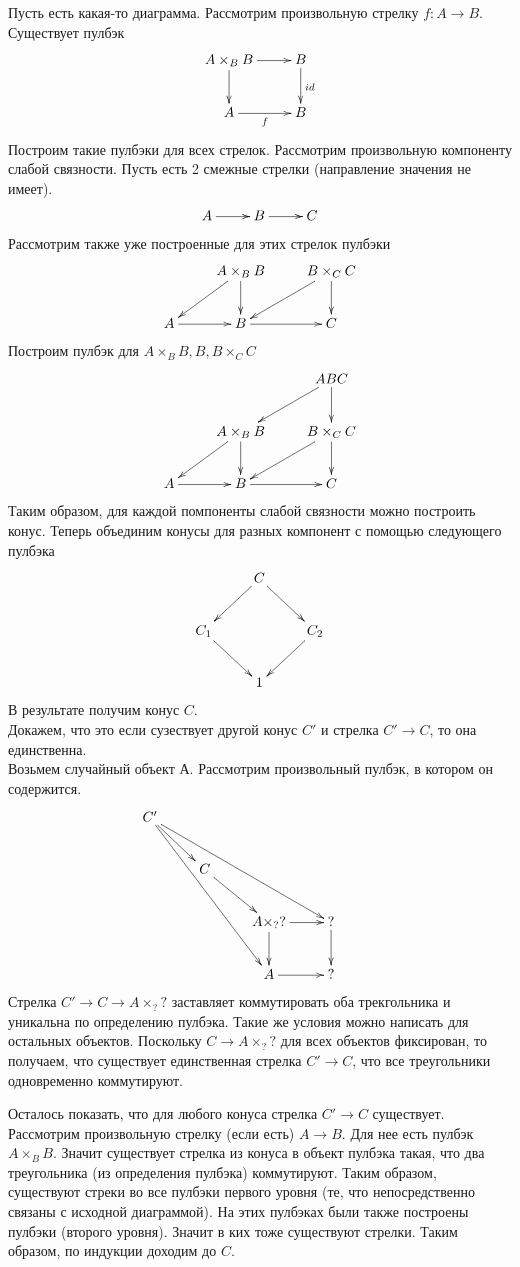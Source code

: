 \documentclass[draft]{article}
\begin{document}
\begin{enumerate}
Пусть есть какая-то диаграмма. Рассмотрим произвольную стрелку $f : A \to B$. Существует пулбэк
\[ \xymatrix{ 
A\times_B B \ar[d] \ar[r] & B \ar[d]^{id} \\
A \ar[r]_{f} & B
} \]
Построим такие пулбэки для всех стрелок. Рассмотрим произвольную компоненту слабой связности. Пусть есть 2 смежные стрелки (направление значения не имеет).
\[ \xymatrix{ 
A\ar[r] & B \ar[r] & C
} \]
Рассмотрим также уже построенные для этих стрелок пулбэки
\[ \xymatrix{ 
& A \times_B B \ar[dl] \ar[d] & B \times_C C \ar[dl] \ar[d] \\
A\ar[r] & B \ar[r] & C
} \]
Построим пулбэк для $A \times_B B, B, B \times_C C$
\[ \xymatrix{ 
&& ABC\ar[dl] \ar[d]\\
& A \times_B B \ar[dl] \ar[d] & B \times_C C \ar[dl] \ar[d] \\
A\ar[r] & B \ar[r] & C
} \]
Таким образом, для каждой помпоненты слабой связности можно построить конус.
Теперь объединим конусы для разных компонент с помощью следующего пулбэка
\[ \xymatrix{ 
&C\ar[dl] \ar[dr] &\\
C_1 \ar[dr] && C_2 \ar[dl] \\
& 1 & 
} \]
В результате получим конус $C$. \\
Докажем, что это если сузествует другой конус $C'$ и стрелка $C'\to C$, то она единственна. \\
Возьмем случайный объект А. Рассмотрим произвольный пулбэк, в котором он содержится. 
\[ \xymatrix{ 
C' \ar[dr] \ar[dddrr] \ar[ddrrr]& & &\\
& C \ar[dr] & & &\\
& & A\times_? ? \ar[d] \ar[r] & ? \ar[d] \\
& & A \ar[r] & ?
} \]
Стрелка $C'\to C \to A\times_? ?$ заставляет коммутировать оба трекгольника и уникальна по определению пулбэка. Такие же условия можно написать для остальных объектов. Поскольку $C \to A\times_? ?$ для всех объектов фиксирован, то получаем, что существует единственная стрелка $C'\to C$, что все треугольники одновременно коммутируют.

Осталось показать, что для любого конуса стрелка $C' \to C$ существует.
Рассмотрим произвольную стрелку (если есть) $A \to B$. Для нее есть пулбэк $A\times_B B$. Значит существует стрелка из конуса в объект пулбэка такая, что два треугольника (из определения пулбэка) коммутируют. Таким образом, существуют стреки во все пулбэки первого уровня (те, что непосредственно связаны с исходной диаграммой). На этих пулбэках были также построены пулбэки (второго уровня). Значит  в ких тоже существуют стрелки. Таким образом, по индукции доходим до $C$.


\end{enumerate}
\end{document}
